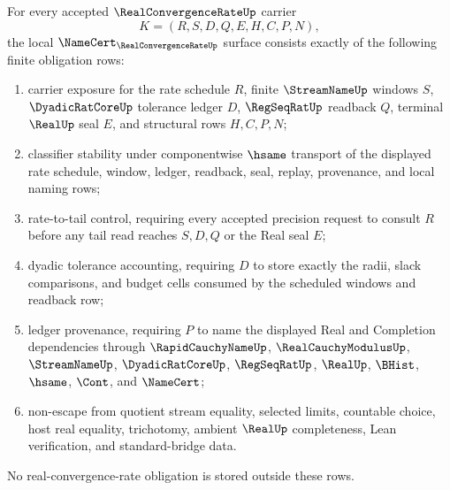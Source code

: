 \begin{theorem}
\label{thm:real-convergence-rate-namecert-obligations}
For every accepted $\RealConvergenceRateUp$ carrier
$$
K=(R,S,D,Q,E,H,C,P,N),
$$
the local $\NameCert_{\RealConvergenceRateUp}$ surface consists exactly of the following finite obligation rows:
\begin{enumerate}
\item carrier exposure for the rate schedule $R$, finite $\StreamNameUp$ windows $S$, $\DyadicRatCoreUp$ tolerance ledger $D$, $\RegSeqRatUp$ readback $Q$, terminal $\RealUp$ seal $E$, and structural rows $H,C,P,N$;
\item classifier stability under componentwise $\hsame$ transport of the displayed rate schedule, window, ledger, readback, seal, replay, provenance, and local naming rows;
\item rate-to-tail control, requiring every accepted precision request to consult $R$ before any tail read reaches $S,D,Q$ or the Real seal $E$;
\item dyadic tolerance accounting, requiring $D$ to store exactly the radii, slack comparisons, and budget cells consumed by the scheduled windows and readback row;
\item ledger provenance, requiring $P$ to name the displayed Real and Completion dependencies through $\RapidCauchyNameUp$, $\RealCauchyModulusUp$, $\StreamNameUp$, $\DyadicRatCoreUp$, $\RegSeqRatUp$, $\RealUp$, $\BHist$, $\hsame$, $\Cont$, and $\NameCert$;
\item non-escape from quotient stream equality, selected limits, countable choice, host real equality, trichotomy, ambient $\RealUp$ completeness, Lean verification, and standard-bridge data.
\end{enumerate}
No real-convergence-rate obligation is stored outside these rows.
\end{theorem}
